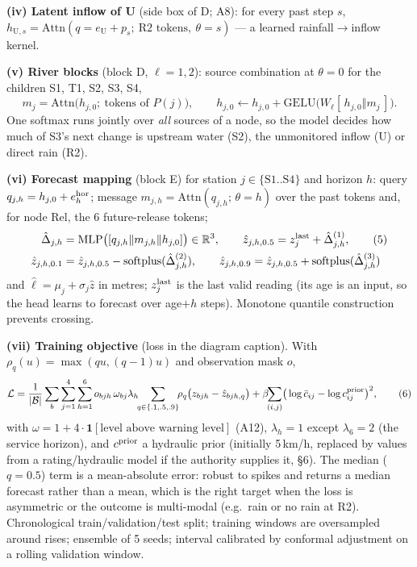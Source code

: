 \noindent\textbf{(iv) Latent inflow of U} (side box of D; A8): for every past step $s$, $h_{\text{U},s}=\mathrm{Attn}(q=e_{\text{U}}+p_s;\ \text{R2 tokens},\ \theta{=}s)$ --- a learned rainfall$\to$inflow kernel.

\noindent\textbf{(v) River blocks} (block D, $\ell=1,2$): source combination at $\theta{=}0$ for the children S1, T1, S2, S3, S4,
\[
m_j=\mathrm{Attn}\big(h_{j,0};\ \text{tokens of }P(j)\big),\qquad h_{j,0}\leftarrow h_{j,0}+\mathrm{GELU}\big(W_{\ell}[\,h_{j,0}\Vert m_j\,]\big).\tag{4b}
\]
One softmax runs jointly over \emph{all} sources of a node, so the model decides how much of S3's next change is upstream water (S2), the unmonitored inflow (U) or direct rain (R2).

\noindent\textbf{(vi) Forecast mapping} (block E) for station $j\in\{\text{S1..S4}\}$ and horizon $h$: query $q_{j,h}=h_{j,0}+e^{\rm hor}_h$; message $m_{j,h}=\mathrm{Attn}(q_{j,h};\,\theta{=}h)$ over the past tokens and, for node Rel, the 6 future-release tokens;
\begin{align}
\hat\Delta_{j,h}&=\mathrm{MLP}\big([q_{j,h}\Vert m_{j,h}\Vert h_{j,0}]\big)\in\mathbb{R}^{3},\qquad \hat z_{j,h,0.5}=z^{\rm last}_j+\hat\Delta^{(1)}_{j,h},\tag{5}\\
\hat z_{j,h,0.1}&=\hat z_{j,h,0.5}-\mathrm{softplus}(\hat\Delta^{(2)}_{j,h}),\qquad \hat z_{j,h,0.9}=\hat z_{j,h,0.5}+\mathrm{softplus}(\hat\Delta^{(3)}_{j,h})\notag
\end{align}
and $\hat\ell=\mu_j+\sigma_j\hat z$ in metres; $z^{\rm last}_j$ is the last valid reading (its age is an input, so the head learns to forecast over age$+h$ steps). Monotone quantile construction prevents crossing.

\noindent\textbf{(vii) Training objective} (loss in the diagram caption). With $\rho_q(u)=\max(qu,(q-1)u)$ and observation mask $o$,
\begin{equation}
\mathcal{L}=\frac1{|\mathcal{B}|}\sum_{b}\sum_{j=1}^{4}\sum_{h=1}^{6}o_{bjh}\,\omega_{bj}\lambda_h\!\!\sum_{q\in\{.1,.5,.9\}}\!\!\rho_q\big(z_{bjh}-\hat z_{bjh,q}\big)+\beta\!\!\sum_{(i,j)}\!\big(\log\bar c_{ij}-\log c^{\rm prior}_{ij}\big)^2,\tag{6}
\end{equation}
with $\omega=1+4\cdot\mathbf{1}[\text{level above warning level}]$ (A12), $\lambda_h=1$ except $\lambda_6=2$ (the service horizon), and $c^{\rm prior}$ a hydraulic prior (initially 5\,km/h, replaced by values from a rating/hydraulic model if the authority supplies it, \S6). The median ($q{=}0.5$) term is a mean-absolute error: robust to spikes and returns a median forecast rather than a mean, which is the right target when the loss is asymmetric or the outcome is multi-modal (e.g.\ rain or no rain at R2). Chronological train/validation/test split; training windows are oversampled around rises; ensemble of 5 seeds; interval calibrated by conformal adjustment on a rolling validation window.

